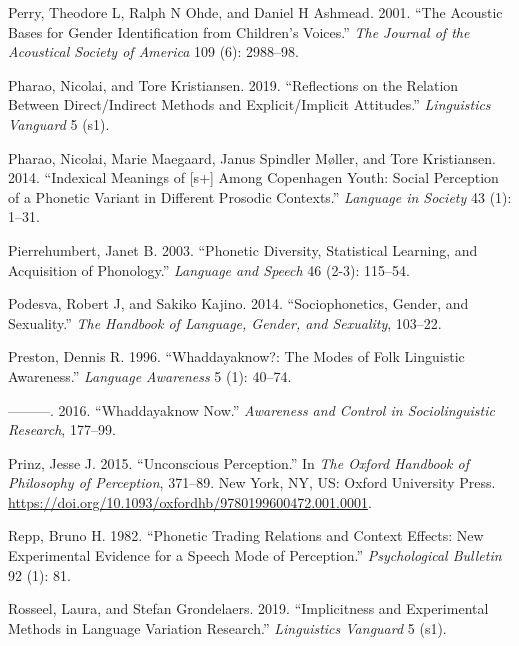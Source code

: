 \documentclass[
  letterpaper,
  DIV=11,
  numbers=noendperiod]{scrartcl}
\newlength{\cslhangindent}
\newenvironment{CSLReferences}[2] %
 {\begin{list}{}{%
  \setlength{\itemindent}{0pt}
  \setlength{\leftmargin}{0pt}
  \setlength{\parsep}{0pt}
  \ifodd #1
   \setlength{\leftmargin}{\cslhangindent}
   \setlength{\itemindent}{-1\cslhangindent}
  \fi
  \setlength{\itemsep}{#2\baselineskip}}}
 {\end{list}}
\begin{document}
\begin{CSLReferences}{1}{0}
Perry, Theodore L, Ralph N Ohde, and Daniel H Ashmead. 2001. {``The
Acoustic Bases for Gender Identification from Children's Voices.''}
\emph{The Journal of the Acoustical Society of America} 109 (6):
2988--98.

Pharao, Nicolai, and Tore Kristiansen. 2019. {``Reflections on the
Relation Between Direct/Indirect Methods and Explicit/Implicit
Attitudes.''} \emph{Linguistics Vanguard} 5 (s1).

Pharao, Nicolai, Marie Maegaard, Janus Spindler Møller, and Tore
Kristiansen. 2014. {``Indexical Meanings of {[}s+{]} Among Copenhagen
Youth: Social Perception of a Phonetic Variant in Different Prosodic
Contexts.''} \emph{Language in Society} 43 (1): 1--31.

Pierrehumbert, Janet B. 2003. {``Phonetic Diversity, Statistical
Learning, and Acquisition of Phonology.''} \emph{Language and Speech} 46
(2-3): 115--54.

Podesva, Robert J, and Sakiko Kajino. 2014. {``Sociophonetics, Gender,
and Sexuality.''} \emph{The Handbook of Language, Gender, and
Sexuality}, 103--22.

Preston, Dennis R. 1996. {``Whaddayaknow?: The Modes of Folk Linguistic
Awareness.''} \emph{Language Awareness} 5 (1): 40--74.

---------. 2016. {``Whaddayaknow Now.''} \emph{Awareness and Control in
Sociolinguistic Research}, 177--99.

Prinz, Jesse J. 2015. {``Unconscious Perception.''} In \emph{The
{Oxford} Handbook of Philosophy of Perception}, 371--89. New York, NY,
US: Oxford University Press.
\url{https://doi.org/10.1093/oxfordhb/9780199600472.001.0001}.

Repp, Bruno H. 1982. {``Phonetic Trading Relations and Context Effects:
New Experimental Evidence for a Speech Mode of Perception.''}
\emph{Psychological Bulletin} 92 (1): 81.

Rosseel, Laura, and Stefan Grondelaers. 2019. {``Implicitness and
Experimental Methods in Language Variation Research.''}
\emph{Linguistics Vanguard} 5 (s1).


\end{CSLReferences}
\end{document}
